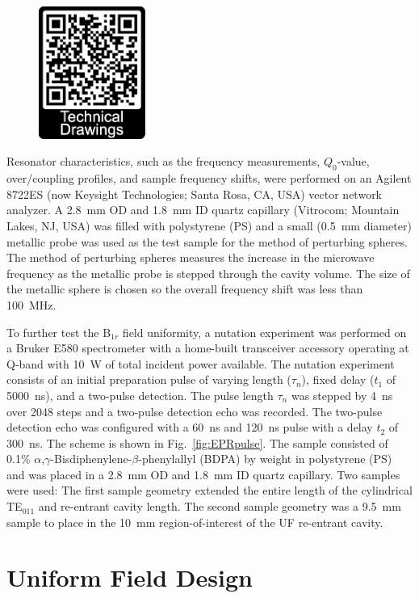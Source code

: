 \begin{figure}
\centering
\includegraphics[width=3.5cm]{Kapitel/Appendix/ActEPRdataQR.eps}
\end{figure}

Resonator characteristics, such as the frequency measurements, $Q_0$-value, over\-/coupling profiles, and sample frequency shifts, were performed on an Agilent 8722ES (now Keysight Technologies; Santa Rosa, CA, USA) vector network analyzer. A 2.8~mm OD and 1.8~mm ID quartz capillary (Vitrocom; Mountain Lakes, NJ, USA) was filled with polystyrene (PS) and a small (0.5~mm diameter) metallic probe was used as the test sample for the method of perturbing spheres. The method of perturbing spheres measures the increase in the microwave frequency as the metallic probe is stepped through the cavity volume. The size of the metallic sphere is chosen so the overall frequency shift was less than 100~MHz.

To further test the B$_{1r}$ field uniformity, a nutation experiment was performed on a Bruker E580 spectrometer with a home-built transceiver accessory operating at Q-band with 10~W of total incident power available. The nutation experiment consists of an initial preparation pulse of varying length ($\tau_n$), fixed delay ($t_1$ of 5000~ns), and a two-pulse detection. The pulse length $\tau_n$ was stepped by 4~ns over 2048 steps and a two-pulse detection echo was recorded. \cite{pulsejeschke} The two-pulse detection echo was configured with a 60~ns and 120~ns pulse with a delay $t_2$ of 300~ns. The scheme is shown in Fig.~\ref{fig:EPRpulse}. The sample consisted of 0.1\% $\alpha$,$\gamma$-Bisdiphenylene-$\beta$-phenylallyl (BDPA) by weight in polystyrene (PS) and was placed in a 2.8~mm OD and 1.8~mm ID  quartz capillary. Two samples were used: The first sample geometry extended the entire length of the cylindrical TE$_{011}$ and re-entrant \cylTE{} cavity length. The second sample geometry was a 9.5~mm sample to place in the 10~mm region-of-interest of the UF re-entrant \cylTE{} cavity.

\section{Uniform Field Design}
